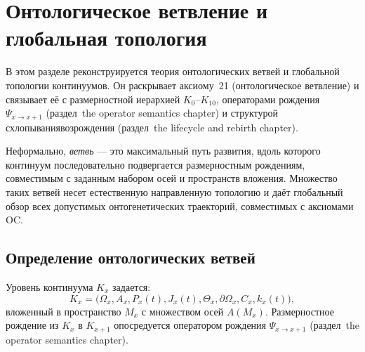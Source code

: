 
\section{Онтологическое ветвление и глобальная топология}
\label{sec:branching-topology}

В этом разделе реконструируется теория онтологических ветвей и глобальной
топологии континуумов. Он раскрывает аксиому~21 (онтологическое
ветвление) и связывает её с размерностной иерархией
\(K_0\)–\(K_{10}\), операторами рождения
\(\Psi_{x\to x+1}\) (раздел~the operator semantics chapter) и структурой
схлопывания\textendash возрождения (раздел~the lifecycle and rebirth chapter).

Неформально, \emph{ветвь} — это максимальный путь развития, вдоль которого
континуум последовательно подвергается размерностным рождениям, совместимым с
заданным набором осей и пространств вложения. Множество таких ветвей
несет естественную направленную топологию и даёт глобальный обзор всех
допустимых онтогенетических траекторий, совместимых с аксиомами OC.

\subsection{Определение онтологических ветвей}

Уровень континуума \(K_x\) задается:
\[
  K_x =
  \big(
    \Omega_x, A_x, P_x(t), J_x(t),
    \Theta_x, \partial\Omega_x, C_x, k_x(t)
  \big),
\]
вложенный в пространство \(M_x\) с множеством осей \(A(M_x)\). Размерностное
рождение из \(K_x\) в \(K_{x+1}\) опосредуется оператором рождения
\(\Psi_{x\to x+1}\) (раздел~the operator semantics chapter).

